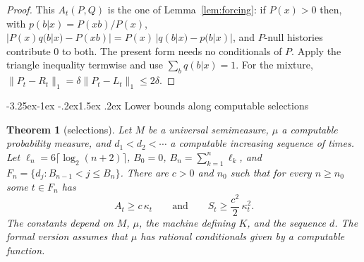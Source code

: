 \documentclass[11pt]{article}
\makeatletter
\renewcommand\subsection{\@startsection{subsection}{2}{\z@}%
  {-3.25ex\@plus -1ex \@minus -.2ex}{1.5ex \@plus .2ex}%
  {\normalfont\large\bfseries\boldmath}}
\newtheorem{theorem}{Theorem}[section]
\theoremstyle{definition}
\theoremstyle{remark}
\makeatother
\begin{document}
\begin{proof}
This $A_t(P,Q)$ is the one of Lemma~\ref{lem:forcing}: if $P(x)>0$ then, with
$p(b|x)=P(xb)/P(x)$, $|P(x)q(b|x)-P(xb)|=P(x)\,|q(b|x)-p(b|x)|$, and $P$-null histories contribute
$0$ to both. The present form needs no conditionals of $P$.
Apply the triangle inequality termwise and use $\sum_bq(b|x)=1$. For the
mixture, $\|P_t-R_t\|_1=\delta\|P_t-L_t\|_1\le2\delta$.
\end{proof}

\subsection{Lower bounds along computable selections}

\begin{theorem}[selections]\label{thm:selection}
Let $M$ be a universal semimeasure, $\mu$ a computable probability measure,
and $d_1<d_2<\cdots$ a computable increasing sequence of times. Let
$\ell_n=6\lceil\log_2(n+2)\rceil$, $B_0=0$, $B_n=\sum_{k=1}^n\ell_k$, and
$F_n=\{d_j:B_{n-1}<j\le B_n\}$. There are $c>0$ and $n_0$ such that for every
$n\ge n_0$ some $t\in F_n$ has
\[
A_t\ge c\,\kappa_t\qquad\text{and}\qquad S_t\ge\frac{c^2}2\,\kappa_t^2 .
\]
The constants depend on $M$, $\mu$, the machine defining $K$, and the
sequence $d$. The formal version assumes that $\mu$ has rational conditionals
given by a computable function.
\end{theorem}
\end{document}
